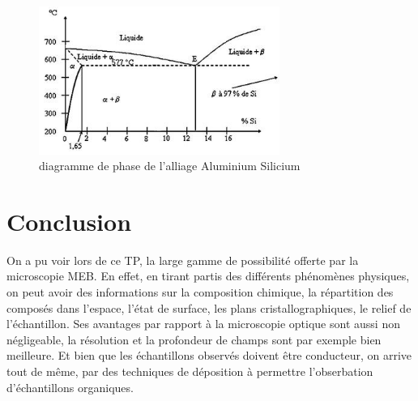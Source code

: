 \documentclass[a4paper,12pt]{article}
\begin{document}
\begin{figure}
\centering
\includegraphics[width=0.7\textwidth]{images/diagphasealusi.jpg}
\caption{diagramme de phase de l'alliage Aluminium Silicium}
\label{fig:diagphase}
\end{figure}

\section*{Conclusion}

On a pu voir lors de ce TP, la large gamme de possibilité offerte par la microscopie MEB. En effet, en tirant partis des différents phénomènes physiques, on peut avoir des informations sur la composition chimique, la répartition des composés dans l'espace, l'état de surface, les plans cristallographiques, le relief de l'échantillon. Ses avantages par rapport à la microscopie optique sont aussi non négligeable, la résolution et la profondeur de champs sont par exemple bien meilleure. Et bien que les échantillons observés doivent être conducteur, on arrive tout de même, par des techniques de déposition à permettre l'obserbation d'échantillons organiques.
\end{document}
